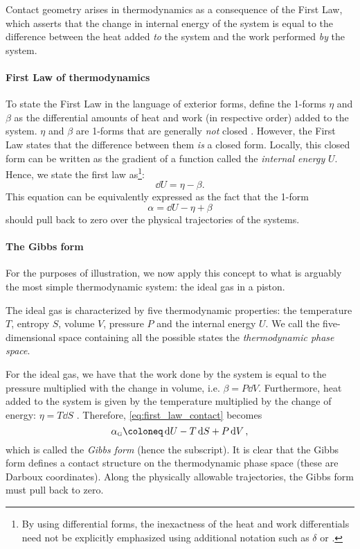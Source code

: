 Contact geometry arises in thermodynamics as a consequence of the First Law, which asserts that the change in internal energy of the system is equal to the difference between the heat added \emph{to} the system and the work performed \emph{by} the system. 

\paragraph{First Law of thermodynamics} To state the First Law in the language of exterior forms, define the 1-forms $\eta$ and $\beta$ as the differential amounts of heat and work (in respective order) added to the system. $\eta$ and $\beta$ are 1-forms that are generally \emph{not} closed \cite{Bamberg1988,Frankel2012}. However, the First Law states that the difference between them \emph{is} a closed form. Locally, this closed form  can be written as the gradient of a function called the \emph{internal energy} $U$. Hence, we state the first law as\footnote{By using differential forms, the inexactness of the heat and work differentials need not be explicitly emphasized using additional notation such as $\delta$ or \dj.}:
\begin{equation}
    \dd{U} = \eta - \beta.
    \label{eq:thermo_first_law}
\end{equation}
This equation can be equivalently expressed as the fact that the 1-form
\begin{equation}
    \alpha = \dd{U} - \eta + \beta
    \label{eq:first_law_contact}
\end{equation}
should pull back to zero over the physical trajectories of the systems.

\paragraph{The Gibbs form} For the purposes of illustration, we now apply this concept to what is arguably the most simple thermodynamic system: the ideal gas in a piston. 

The ideal gas is characterized by five thermodynamic properties: the temperature $T$, entropy $S$, volume $V$, pressure $P$ and the internal energy $U$. We call the five-dimensional space containing all the possible states the \emph{thermodynamic phase space}.

For the ideal gas, we have that the work done by the system is equal to the pressure multiplied with the change in volume, i.e. $\beta = P\dd{V}$. Furthermore, heat added to the system is given by the temperature multiplied by the change of energy: $\eta = T\dd{S}$ \cite{Arnold1989b,Wightman1979,Bamberg1988}. Therefore, \cref{eq:first_law_contact} becomes
\begin{equation}
    \alpha_\text{\tiny G} \coloneq \dd{U} - T\dd{S} + P\dd{V},
    \label{eq:gibbs_form}
\end{equation}
which is called the \emph{Gibbs form} (hence the subscript). It is clear that the Gibbs form defines a contact structure on the thermodynamic phase space (these are Darboux coordinates). Along the physically allowable trajectories, the Gibbs form must pull back to zero.


